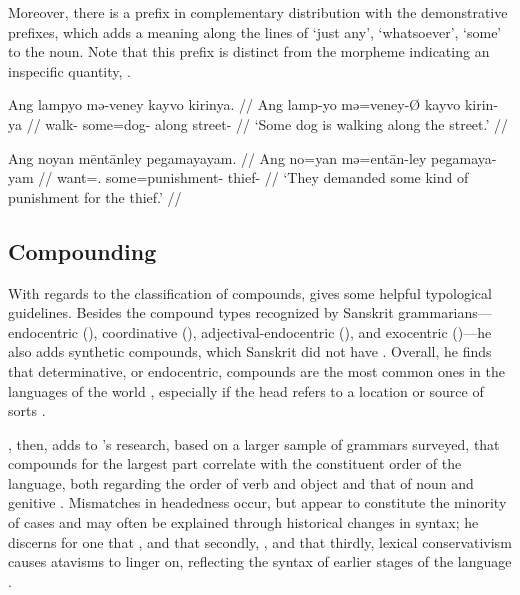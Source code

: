 \xe

Moreover, there is a prefix  in complementary distribution with 
the demonstrative prefixes, which adds a meaning along the lines of `just any', 
`whatsoever', `some' to the noun. Note that this prefix is distinct from the 
morpheme indicating an inspecific quantity, .

\pex
\a\begingl
	\gla Ang lampyo mə-veney kayvo kirinya. //
	\glb Ang lamp-yo mə=veney-Ø kayvo kirin-ya //
	\glc \AgtT{} walk-\TsgN{} some=dog-\Top{} along street-\Loc{} //
	\glft `Some dog is walking along the street.' //
\endgl

\a\begingl
	\gla Ang noyan mēntānley pegamayayam. //
	\glb Ang no=yan mə=entān-ley pegamaya-yam //
	\glc \AgtT{} want=\TsgM{}.\Top{} some=punishment-\PargI{} 
		thief-\Dat{} //
	\glft `They demanded some kind of punishment for the thief.' //
\endgl

\xe


\subsection{Compounding}

With regards to the classification of compounds, \citet{bauer2001} gives some 
helpful typological guidelines. Besides the compound types recognized by 
Sanskrit grammarians---endocentric (), coordinative 
(), adjectival-endo\-cent\-ric (), and 
exocentric ()---he also adds synthetic compounds, which Sanskrit 
did not have \citep[697]{bauer2001}. Overall, he finds that determinative, or 
endocentric, compounds are the most common ones in the languages of the world 
\citep[697]{bauer2001}, especially if the head refers to a location or source 
of sorts \citep[702]{bauer2001}.

\citet{gaeta2008}, then, adds to \citeauthor{bauer2001}'s research, based on a 
larger sample of grammars surveyed, that compounds for the largest part 
correlate with the constituent order of the language, both regarding the order 
of verb and object and that of noun and genitive \citep[129--133]{gaeta2008}. 
Mismatches in headedness occur, but appear to constitute the minority of cases 
and may often be explained through historical changes in syntax; he discerns  
for one that , and that secondly, , and that 
thirdly, lexical conservativism causes atavisms to linger on, reflecting the 
syntax of earlier stages of the language \citep[138--139]{gaeta2008}.

